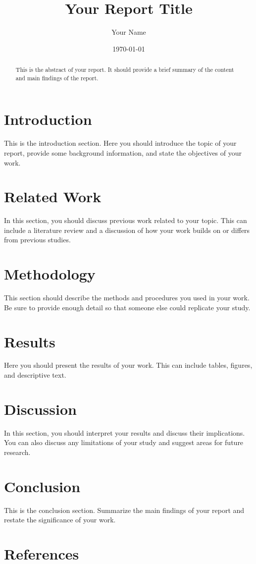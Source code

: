 \documentclass[12pt]{article}
\title{Your Report Title}
\author{Your Name}
\date{\today}
\begin{document}
\maketitle

\begin{abstract}
This is the abstract of your report. It should provide a brief summary of the content and main findings of the report.
\end{abstract}

\section{Introduction}
This is the introduction section. Here you should introduce the topic of your report, provide some background information, and state the objectives of your work.

\section{Related Work}
In this section, you should discuss previous work related to your topic. This can include a literature review and a discussion of how your work builds on or differs from previous studies.

\section{Methodology}
This section should describe the methods and procedures you used in your work. Be sure to provide enough detail so that someone else could replicate your study.

\section{Results}
Here you should present the results of your work. This can include tables, figures, and descriptive text.

\section{Discussion}
In this section, you should interpret your results and discuss their implications. You can also discuss any limitations of your study and suggest areas for future research.

\section{Conclusion}
This is the conclusion section. Summarize the main findings of your report and restate the significance of your work.

\section{References}


\end{document}
